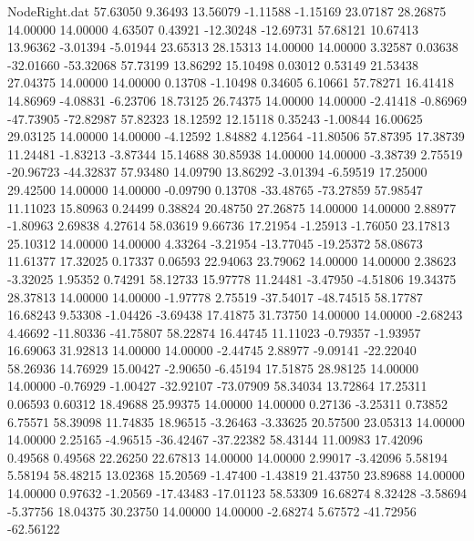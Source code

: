 \begin{filecontents}{NodeRight.dat}
  57.63050    9.36493   13.56079    -1.11588   -1.15169   23.07187   28.26875   14.00000   14.00000    4.63507    0.43921  -12.30248  -12.69731
  57.68121   10.67413   13.96362    -3.01394   -5.01944   23.65313   28.15313   14.00000   14.00000    3.32587    0.03638  -32.01660  -53.32068
  57.73199   13.86292   15.10498     0.03012    0.53149   21.53438   27.04375   14.00000   14.00000    0.13708   -1.10498    0.34605    6.10661
  57.78271   16.41418   14.86969    -4.08831   -6.23706   18.73125   26.74375   14.00000   14.00000   -2.41418   -0.86969  -47.73905  -72.82987
  57.82323   18.12592   12.15118     0.35243   -1.00844   16.00625   29.03125   14.00000   14.00000   -4.12592    1.84882    4.12564  -11.80506
  57.87395   17.38739   11.24481    -1.83213   -3.87344   15.14688   30.85938   14.00000   14.00000   -3.38739    2.75519  -20.96723  -44.32837
  57.93480   14.09790   13.86292    -3.01394   -6.59519   17.25000   29.42500   14.00000   14.00000   -0.09790    0.13708  -33.48765  -73.27859
  57.98547   11.11023   15.80963     0.24499    0.38824   20.48750   27.26875   14.00000   14.00000    2.88977   -1.80963    2.69838    4.27614
  58.03619    9.66736   17.21954    -1.25913   -1.76050   23.17813   25.10312   14.00000   14.00000    4.33264   -3.21954  -13.77045  -19.25372
  58.08673   11.61377   17.32025     0.17337    0.06593   22.94063   23.79062   14.00000   14.00000    2.38623   -3.32025    1.95352    0.74291
  58.12733   15.97778   11.24481    -3.47950   -4.51806   19.34375   28.37813   14.00000   14.00000   -1.97778    2.75519  -37.54017  -48.74515
  58.17787   16.68243    9.53308    -1.04426   -3.69438   17.41875   31.73750   14.00000   14.00000   -2.68243    4.46692  -11.80336  -41.75807
  58.22874   16.44745   11.11023    -0.79357   -1.93957   16.69063   31.92813   14.00000   14.00000   -2.44745    2.88977   -9.09141  -22.22040
  58.26936   14.76929   15.00427    -2.90650   -6.45194   17.51875   28.98125   14.00000   14.00000   -0.76929   -1.00427  -32.92107  -73.07909
  58.34034   13.72864   17.25311     0.06593    0.60312   18.49688   25.99375   14.00000   14.00000    0.27136   -3.25311    0.73852    6.75571
  58.39098   11.74835   18.96515    -3.26463   -3.33625   20.57500   23.05313   14.00000   14.00000    2.25165   -4.96515  -36.42467  -37.22382
  58.43144   11.00983   17.42096     0.49568    0.49568   22.26250   22.67813   14.00000   14.00000    2.99017   -3.42096    5.58194    5.58194
  58.48215   13.02368   15.20569    -1.47400   -1.43819   21.43750   23.89688   14.00000   14.00000    0.97632   -1.20569  -17.43483  -17.01123
  58.53309   16.68274    8.32428    -3.58694   -5.37756   18.04375   30.23750   14.00000   14.00000   -2.68274    5.67572  -41.72956  -62.56122

\end{filecontents}
